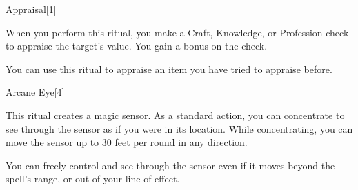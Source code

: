 \begin{spellsection}{Appraisal}[1]
    \begin{spellheader}
    \end{spellheader}
    \begin{spellcontent}
        \begin{spelltargetinginfo}
        \end{spelltargetinginfo}
        \begin{spelleffects}
            \spelleffect When you perform this ritual, you make a Craft, Knowledge, or Profession check to appraise the target's value. You gain a  bonus on the check.
        \end{spelleffects}
    \end{spellcontent}
    \begin{spellfooter}
        \spellnotes You can use this ritual to appraise an item you have tried to appraise before.
    \end{spellfooter}
    \begin{spellaugments}
    \end{spellaugments}
\end{spellsection}

\begin{spellsection}{Arcane Eye}[4]
    \begin{spellheader}
    \end{spellheader}
    \begin{spellcontent}
        \begin{spelltargetinginfo}
            \spellrng{\rngmed}
        \end{spelltargetinginfo}
        \begin{spelleffects}
            \spelleffect This ritual creates a magic sensor. As a standard action, you can concentrate to see through the sensor as if you were in its location. While concentrating, you can move the sensor up to 30 feet per round in any direction.

            You can freely control and see through the sensor even if it moves beyond the spell's range, or out of your line of effect.
            \spelldur \durlong \dismissable
        \end{spelleffects}
    \end{spellcontent}
    \begin{spellfooter}
        \spellnotes {}
    \end{spellfooter}
    \begin{spellaugments}
    \end{spellaugments}
\end{spellsection}

